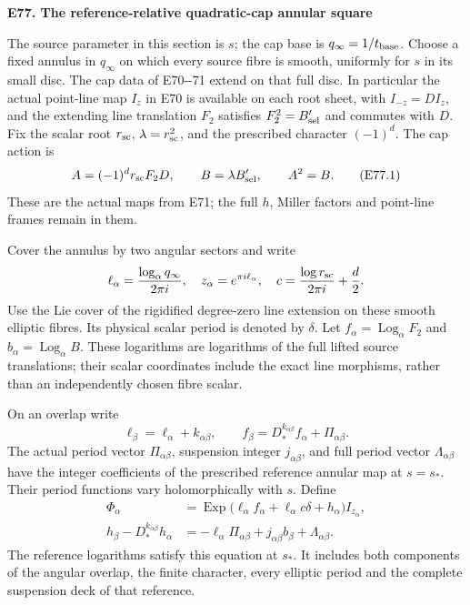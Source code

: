 \par

\medskip\noindent\textbf{E77. The reference-relative quadratic-cap annular square}

\par\nobreak

The source parameter in this section is \(s\); the cap base is
\(q_\infty=1/t_{\rm base}\). Choose a fixed annulus in
\(q_\infty\) on which every source fibre is smooth, uniformly
for \(s\) in its small disc. The cap data of E70-\/-71 extend
on that full disc. In particular the actual point-line map
\(I_z\) in E70 is available on each root sheet, with
\(I_{-z}=D I_z\), and the extending line translation \(F_2\)
satisfies \(F_2^2=B'_{\rm sel}\) and commutes with \(D\).
Fix the scalar root \(r_{\rm sc}\), \(\lambda=r_{\rm sc}^2\),
and the prescribed character \((-1)^d\). The cap action is
\[
 A=(-1)^d r_{\rm sc}F_2D,\qquad
 B=\lambda B'_{\rm sel},\qquad A^2=B.            \tag{E77.1}
\]
These are the actual maps from E71; the full \(h\), Miller
factors and point-line frames remain in them.

Cover the annulus by two angular sectors and write
\[
 \ell_\alpha=\frac{\log_\alpha q_\infty}{2\pi i},
 \quad z_\alpha=e^{\pi i\ell_\alpha},\quad
 c=\frac{\log r_{\rm sc}}{2\pi i}+\frac d2 .
\]
Use the Lie cover of the rigidified degree-zero line
extension on these smooth elliptic fibres. Its physical
scalar period is denoted by \(\delta\). Let
\(f_\alpha=\operatorname{Log}_\alpha F_2\) and
\(b_\alpha=\operatorname{Log}_\alpha B\). These logarithms
are logarithms of the full lifted source translations;
their scalar coordinates include the exact line morphisms,
rather than an independently chosen fibre scalar.

On an overlap write
\[
 \ell_\beta=\ell_\alpha+k_{\alpha\beta},\qquad
 f_\beta=D_*^{k_{\alpha\beta}}f_\alpha+
                                      \Pi_{\alpha\beta}.
\]
The actual period vector \(\Pi_{\alpha\beta}\), suspension
integer \(j_{\alpha\beta}\), and full period vector
\(\Lambda_{\alpha\beta}\) have the integer coefficients of
the prescribed reference annular map at \(s=s_*\). Their
period functions vary holomorphically with \(s\). Define
\[
\begin{aligned}
 \Phi_\alpha&=
 \operatorname{Exp}\bigl(\ell_\alpha f_\alpha+
                \ell_\alpha c\delta+h_\alpha\bigr)I_{z_\alpha},\\
 h_\beta-D_*^{k_{\alpha\beta}}h_\alpha
   &=-\ell_\alpha\Pi_{\alpha\beta}
         +j_{\alpha\beta}b_\beta+\Lambda_{\alpha\beta}.
\end{aligned}                                                   \tag{E77.2}
\]
The reference logarithms satisfy this equation at \(s_*\).
It includes both components of the angular overlap, the
finite character, every elliptic period and the complete
suspension deck of that reference.

